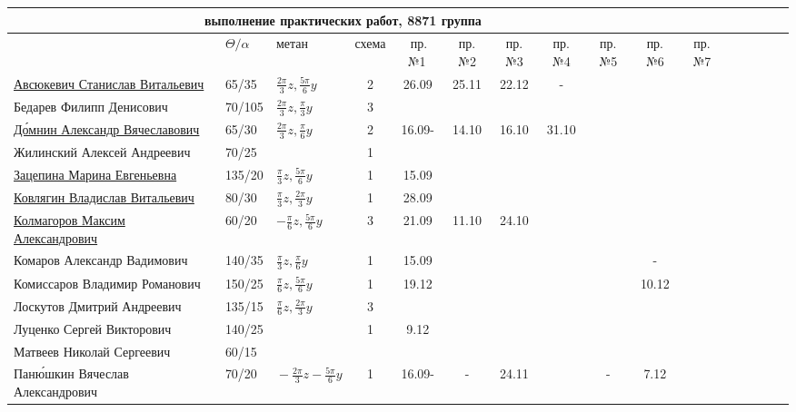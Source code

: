 \documentclass[a4paper,landscape,11pt]{article}
\begin{document}
\newpage
%
\hspace{-4.1cm}
\begin{tabular}{l|llccccccccccccc}
\multicolumn{10}{c}{выполнение практических работ, 8871 группа} \\
\toprule
			&$\Theta/\alpha$&метан&схема&\,пр.№1\,&пр.№2&пр.№3&пр.№4&пр.№5&пр.№6&пр.№7\\
\midrule
	\href{}{Авсюкевич Станислав Витальевич}	        &65/35 &$\frac{2\pi}{3}z,\frac{5\pi}{6}y$&2&\,26.09\,&25.11&22.12&-\\
	Бедарев Филипп Денисович        &70/105&$\frac{2\pi}{3}z,\frac{\pi}{3}y$&3&       &&\\
	\href{}{Д\'{о}мнин Александр Вячеславович}                  &65/30 &$\frac{2\pi}{3}z,\frac{\pi}{6}y$&2&\,16.09-\,&14.10&16.10&31.10\\ 
	Жилинский Алексей Андреевич	&70/25 &&1&       &&\\
	\href{}{Зацепина Марина Евгеньевна}	&135/20&$\frac{\pi}{3}z,\frac{5\pi}{6}y$&1&\,15.09\,&&\\	
	\href{}{Ковлягин Владислав Витальевич}	                &80/30 &$\frac{\pi}{3}z,\frac{2\pi}{3}y$&1&\,28.09\,&&\\
	\href{}{Колмагоров Максим Александрович}	        &60/20 &$-\frac{\pi}{6}z,\frac{5\pi}{6}y$&3&\,21.09\,&11.10&24.10\\
\midrule                                     
	Комаров Александр Вадимович	&140/35&$\frac{\pi}{3}z,\frac{\pi}{6}y$&1&\,15.09\,&&&&&-\\
	Комиссаров Владимир Романович	&150/25&$\frac{\pi}{6}z,\frac{5\pi}{6}y$&1&19.12&&&&&10.12\\
	Лоскутов Дмитрий Андреевич	&135/15&$\frac{\pi}{6}z,\frac{2\pi}{3}y$&3&       &&\\	
	Луценко Сергей Викторович	&140/25&&       1&9.12&\\	
Матвеев Николай Сергеевич	&60/15\\	
	Пан\'{ю}шкин Вячеслав Александрович\,&70/20 &$\!-\!\frac{2\pi}{3}z\!-\!\frac{5\pi}{6}y\!$&1&\,16.09-\,&-&24.11&&-&7.12\\
\midrule                                  

\end{tabular}
\end{document}
